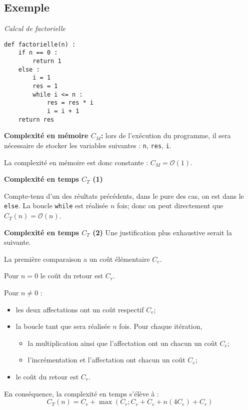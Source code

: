 \subsection{Exemple}

\begin{exemple}
\textit{Calcul de factorielle}
\begin{lstlisting}
def factorielle(n) :
    if n == 0 : 
        return 1
    else : 
        i = 1
        res = 1
        while i <= n :
            res = res * i
            i = i + 1
    return res
\end{lstlisting}


\textbf{Complexité en mémoire $C_M$:} lors de l'exécution du programme, il sera nécessaire de stocker les variables suivantes : 
\texttt{n}, \texttt{res}, \texttt{i}.

La complexité en mémoire est donc constante : $C_M = \mathcal{O}(1)$.

\textbf{Complexité en temps $C_T$ (1)}

Compte-tenu d'un des réultats précédents, dans le pure des cas, on est dans le \texttt{else}. La boucle \texttt{while} est réalisée $n$ fois; donc on peut directement que $C_T(n)=\mathcal{O}(n)$.
 
\textbf{Complexité en temps $C_T$ (2)}
Une justification plus exhaustive serait la suivante.


La première comparaison a un coût élémentaire $C_e$.

Pour $n=0$  le coût du retour est $C_r$.

Pour $n \neq 0$ :
\begin{itemize}
\item les deux affectations ont un coût respectif $C_e$;
\item la boucle tant que sera réalisée $n$ fois. Pour chaque itération, 
\begin{itemize}
\item la multiplication ainsi que l'affectation ont un chacun un coût $C_e$;
\item l'incrémentation et l'affectation ont chacun un coût $C_e$;
\end{itemize}
\item le coût du retour est $C_r$.
\end{itemize}
En conséquence, la complexité en temps s'élève à :
$$C_T(n) = C_e + \max\left( C_r;  C_e + C_e + n\left( 4C_e\right) + C_r\right)$$


\end{exemple}

